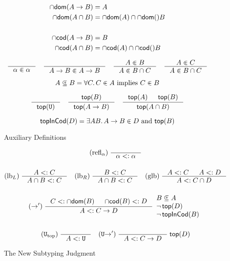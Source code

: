 \documentclass{article}
\begin{document}
\begin{figure}[tbp]

  \begin{align*}
  \dom{A \to B} &= A \\
  \dom{A \cap B} &= \dom{A} \cap \dom {B} \\
  \\
  \cod{A \to B} &= B \\
  \cod{A \cap B} &= \cod{A} \cap \cod {B}
  \end{align*}

  \begin{gather*}
    \inference{}{\alpha \inside \alpha}  \quad
    \inference{}{A \to B \inside A \to B} \quad
    \inference{A \inside B}{A \inside B \cap C} \quad
    \inference{A \inside C}{A \inside B \cap C}
  \end{gather*}

  \[
     A \subsetpluseq B = \forall C.\, C \inplus A \text{ implies } C \inplus B
  \]

  \begin{gather*}
    \inference{}{\topP{\TOP}}
    \quad
    \inference{\topP{B}}{\topP{A \to B}}
    \quad
    \inference{\topP{A} & \topP{B}}{\topP{A \cap B}}
  \end{gather*}

  \[
  \mathsf{topInCod}(D) =
     \exists A B.\, A \to B \inplus D \text{ and } \mathsf{top}(B)  
  \]

  \caption{Auxiliary Definitions}
  \label{fig:aux}
\end{figure}


\begin{figure}[tbp]
  \begin{gather*}
    \text{(refl$_\alpha$)} \; \inference{}{\alpha <: \alpha} \\[3ex]
    \text{(lb$_L$)} \; \inference{A <: C}{A \cap B <: C} \quad
    \text{(lb$_R$)} \; \inference{B <: C}{A \cap B <: C} \quad
    \text{(glb)} \; \inference{A <: C & A <: D}{A <: C \cap D} \\[3ex]
    (\to') \; \inference{C <: \dom{B} & \cod{B} <: D }{A <: C \to D}
    \begin{array}{l}
      B \contains A\\
      \neg\, \mathsf{top}(D) \\
      \neg \, \mathsf{topInCod}(B)
      \end{array}\\[3ex]
    (\TOP_{\mathrm{top}}) \; \inference{}{A <: \TOP} \quad
    (\TOP{\to}') \; \inference{}{A <: C \to D}\;\mathsf{top}(D)
  \end{gather*}
  \caption{The New Subtyping Judgment}
  \label{fig:new-subtyping}
\end{figure}
\end{document}
